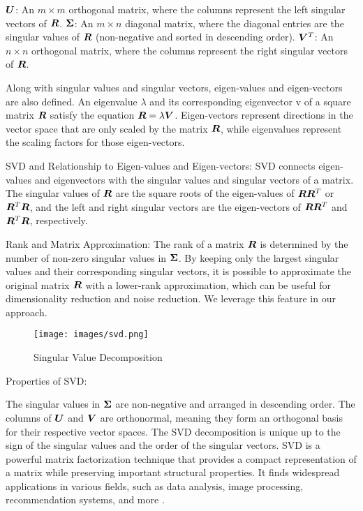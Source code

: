 \documentclass{article}
\begin{document}
${\bm{U}}$: An $m \times m$ orthogonal matrix, where the columns represent the left singular vectors of ${\bm{R}}$.
${\bm{\Sigma}}$: An $m \times n$ diagonal matrix, where the diagonal entries are the singular values of ${\bm{R}}$ (non-negative and sorted in descending order).
${\bm{V}}^T$: An $n\times n$ orthogonal matrix, where the columns represent the right singular vectors of ${\bm{R}}$.

Along with singular values and singular vectors, eigen-values and eigen-vectors are also defined.
An eigenvalue $\lambda$ and its corresponding eigenvector v of a square matrix ${\bm{R}}$ satisfy the equation ${\bm{R}} = \lambda {\bm{V}}$. Eigen-vectors represent directions in the vector space that are only scaled by the matrix ${\bm{R}}$, while eigenvalues represent the scaling factors for those eigen-vectors.


SVD and Relationship to Eigen-values and Eigen-vectors:
SVD connects eigen-values and eigenvectors with the singular values and singular vectors of a matrix. The singular values of ${\bm{R}}$ are the square roots of the eigen-values of ${\bm{R}} {\bm{R}}^T$ or ${\bm{R}}^T{\bm{R}}$, and the left and right singular vectors are the eigen-vectors of ${\bm{R}} {\bm{R}}^T$ and ${\bm{R}}^T{\bm{R}}$, respectively.

Rank and Matrix Approximation:
The rank of a matrix ${\bm{R}}$ is determined by the number of non-zero singular values in ${\bm{\Sigma}}$. By keeping only the largest singular values and their corresponding singular vectors, it is possible to approximate the original matrix ${\bm{R}}$ with a lower-rank approximation, which can be useful for dimensionality reduction and noise reduction. We leverage this feature in our approach.
\begin{figure}[H]
    \centering
    \texttt{[image: images/svd.png]}
    \caption{Singular Value Decomposition}
    \label{fig:svd}
\end{figure}
Properties of SVD:

The singular values in ${\bm{\Sigma}}$ are non-negative and arranged in descending order.
The columns of ${\bm{U}}$ and ${\bm{V}}$ are orthonormal, meaning they form an orthogonal basis for their respective vector spaces.
The SVD decomposition is unique up to the sign of the singular values and the order of the singular vectors.
SVD is a powerful matrix factorization technique that provides a compact representation of a matrix while preserving important structural properties. It finds widespread applications in various fields, such as data analysis, image processing, recommendation systems, and more \cite{mml}.
\end{document}
